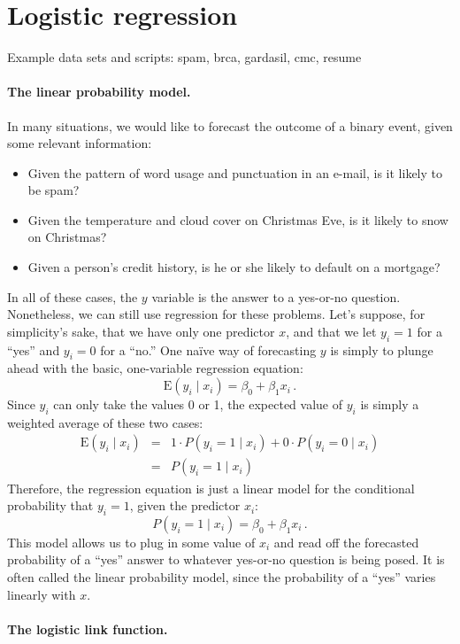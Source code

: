 \documentclass[11pt]{article}
\newcommand{\E}{\mbox{E}}
\newcommand{\1}[1]{\mathbf{1}_{\{ {#1} \}}}
\begin{document}
\section{Logistic regression}
Example data sets and scripts: spam, brca, gardasil, cmc, resume


\paragraph{The linear probability model.} In many situations, we would like to forecast the outcome of a binary event, given some relevant information:
\begin{itemize}
\item Given the pattern of word usage and punctuation in an e-mail, is it likely to be spam?
\item Given the temperature and cloud cover on Christmas Eve, is it likely to snow on Christmas?
\item Given a person's credit history, is he or she likely to default on a mortgage?
\end{itemize}

In all of these cases, the $y$ variable is the answer to a yes-or-no question.  Nonetheless, we can still use regression for these problems.  Let's suppose, for simplicity's sake, that we have only one predictor $x$, and that we let $y_i = 1$ for a ``yes'' and $y_i = 0$ for a ``no.''  One na\"ive way of forecasting $y$ is simply to plunge ahead with the basic, one-variable regression equation:
$$
\E(y_i \mid x_i) = \beta_0 + \beta_1 x_i \, .
$$
Since $y_i$ can only take the values 0 or 1, the expected value of $y_i$ is simply a weighted average of these two cases: 
\begin{eqnarray*}
\E(y_i \mid x_i) &=& 1 \cdot P(y_i = 1 \mid x_i) + 0 \cdot P(y_i = 0 \mid x_i) \\
&=& P(y_i =1 \mid x_i) 
\end{eqnarray*}
Therefore, the regression equation is just a linear model for the conditional probability that $y_i = 1$, given the predictor $x_i$:
$$
P(y_i =1 \mid x_i) = \beta_0 + \beta_1 x_i \, .
$$
This model allows us to plug in some value of $x_i$ and read off the forecasted probability of a ``yes'' answer to whatever yes-or-no question is being posed.  It is often called the linear probability model, since the probability of a ``yes'' varies linearly with $x$.


\paragraph{The logistic link function.}
\end{document}
